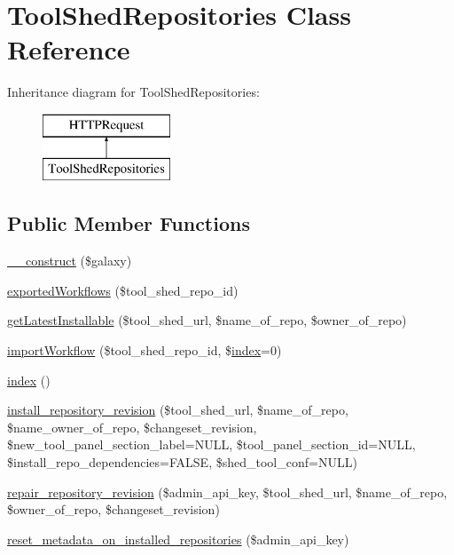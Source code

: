 \hypertarget{classToolShedRepositories}{}\section{Tool\+Shed\+Repositories Class Reference}
\label{classToolShedRepositories}
Inheritance diagram for Tool\+Shed\+Repositories\+:\begin{figure}[H]
\begin{center}
\leavevmode
\includegraphics[height=2.000000cm]{classToolShedRepositories}
\end{center}
\end{figure}
\subsection*{Public Member Functions}
\begin{DoxyCompactItemize}
\item 
\hyperlink{classToolShedRepositories_ab56e4a423edc1a5ed031c4c9577cc0ff}{\+\_\+\+\_\+construct} (\$galaxy)
\item 
\hyperlink{classToolShedRepositories_acb3980f17136e97d4fa59154cc244972}{exported\+Workflows} (\$tool\+\_\+shed\+\_\+repo\+\_\+id)
\item 
\hyperlink{classToolShedRepositories_a53d6bd1df455d24d3739a7899b4e7dc8}{get\+Latest\+Installable} (\$tool\+\_\+shed\+\_\+url, \$name\+\_\+of\+\_\+repo, \$owner\+\_\+of\+\_\+repo)
\item 
\hyperlink{classToolShedRepositories_a61346794a4621ded6a8e7e261e80a0bd}{import\+Workflow} (\$tool\+\_\+shed\+\_\+repo\+\_\+id, \$\hyperlink{classToolShedRepositories_a7876ffc1b34b68094bb09b5f485bef4f}{index}=0)
\item 
\hyperlink{classToolShedRepositories_a7876ffc1b34b68094bb09b5f485bef4f}{index} ()
\item 
\hyperlink{classToolShedRepositories_aed1040aa143e1625bf0edce49eb2b272}{install\+\_\+repository\+\_\+revision} (\$tool\+\_\+shed\+\_\+url, \$name\+\_\+of\+\_\+repo, \$name\+\_\+owner\+\_\+of\+\_\+repo, \$changeset\+\_\+revision, \$new\+\_\+tool\+\_\+panel\+\_\+section\+\_\+label=N\+U\+LL, \$tool\+\_\+panel\+\_\+section\+\_\+id=N\+U\+LL, \$install\+\_\+repo\+\_\+dependencies=F\+A\+L\+SE, \$shed\+\_\+tool\+\_\+conf=N\+U\+LL)
\item 
\hyperlink{classToolShedRepositories_ae38b97508575d84d60d4f30bc72dc314}{repair\+\_\+repository\+\_\+revision} (\$admin\+\_\+api\+\_\+key, \$tool\+\_\+shed\+\_\+url, \$name\+\_\+of\+\_\+repo, \$owner\+\_\+of\+\_\+repo, \$changeset\+\_\+revision)
\item 
\hyperlink{classToolShedRepositories_a29438f079b2fb983b66daad8a471b235}{reset\+\_\+metadata\+\_\+on\+\_\+installed\+\_\+repositories} (\$admin\+\_\+api\+\_\+key)
\end{DoxyCompactItemize}
